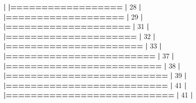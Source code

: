\documentclass[]{book}
\newenvironment{Shaded}{\begin{snugshade}}{\end{snugshade}}
\newcommand{\DecValTok}[1]{\textcolor[rgb]{0.00,0.00,0.81}{#1}}
\newcommand{\ErrorTok}[1]{\textcolor[rgb]{0.64,0.00,0.00}{\textbf{#1}}}
\newcommand{\NormalTok}[1]{#1}
\newcommand{\OperatorTok}[1]{\textcolor[rgb]{0.81,0.36,0.00}{\textbf{#1}}}
\newcommand{\StringTok}[1]{\textcolor[rgb]{0.31,0.60,0.02}{#1}}
\begin{document}
\begin{Shaded}
\begin{Highlighting}[]
{{{{{{{{{{{{  \OperatorTok{|}\StringTok{                                                                       }
\StringTok{  }\ErrorTok{|==================}\StringTok{                                               }\ErrorTok{|}\StringTok{  }\DecValTok{28}\NormalTok{%}
  \OperatorTok{|}\StringTok{                                                                       }
\StringTok{  }\ErrorTok{|===================}\StringTok{                                              }\ErrorTok{|}\StringTok{  }\DecValTok{29}\NormalTok{%}
  \OperatorTok{|}\StringTok{                                                                       }
\StringTok{  }\ErrorTok{|====================}\StringTok{                                             }\ErrorTok{|}\StringTok{  }\DecValTok{31}\NormalTok{%}
  \OperatorTok{|}\StringTok{                                                                       }
\StringTok{  }\ErrorTok{|=====================}\StringTok{                                            }\ErrorTok{|}\StringTok{  }\DecValTok{32}\NormalTok{%}
  \OperatorTok{|}\StringTok{                                                                       }
\StringTok{  }\ErrorTok{|======================}\StringTok{                                           }\ErrorTok{|}\StringTok{  }\DecValTok{33}\NormalTok{%}
  \OperatorTok{|}\StringTok{                                                                       }
\StringTok{  }\ErrorTok{|========================}\StringTok{                                         }\ErrorTok{|}\StringTok{  }\DecValTok{37}\NormalTok{%}
  \OperatorTok{|}\StringTok{                                                                       }
\StringTok{  }\ErrorTok{|=========================}\StringTok{                                        }\ErrorTok{|}\StringTok{  }\DecValTok{38}\NormalTok{%}
  \OperatorTok{|}\StringTok{                                                                       }
\StringTok{  }\ErrorTok{|==========================}\StringTok{                                       }\ErrorTok{|}\StringTok{  }\DecValTok{39}\NormalTok{%}
  \OperatorTok{|}\StringTok{                                                                       }
\StringTok{  }\ErrorTok{|==========================}\StringTok{                                       }\ErrorTok{|}\StringTok{  }\DecValTok{41}\NormalTok{%}
  \OperatorTok{|}\StringTok{                                                                       }
\StringTok{  }\ErrorTok{|===========================}\StringTok{                                      }\ErrorTok{|}\StringTok{  }\DecValTok{41}\NormalTok{%}
  \OperatorTok{|}\StringTok{                                                                       }
}}}}}}}}}}}}}}}}}}}}}}
\end{Highlighting}
\end{Shaded}
\end{document}
